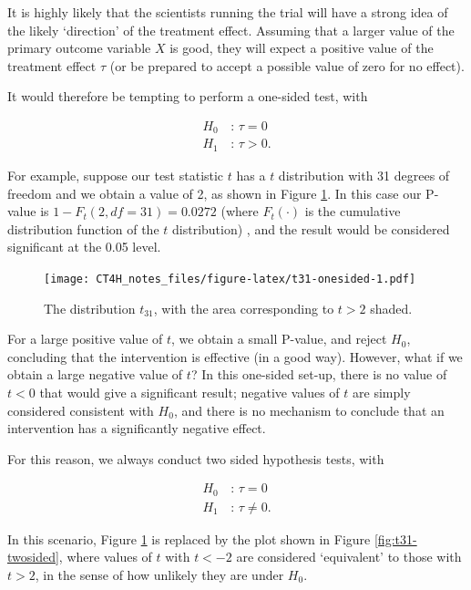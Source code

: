 \documentclass[
  openany]{book}
\theoremstyle{definition}
\theoremstyle{definition}
\theoremstyle{definition}
\theoremstyle{definition}
\theoremstyle{remark}
\begin{document}
It is highly likely that the scientists running the trial will have a strong idea of the likely `direction' of the treatment effect. Assuming that a larger value of the primary outcome variable \(X\) is good, they will expect a positive value of the treatment effect \(\tau\) (or be prepared to accept a possible value of zero for no effect).

It would therefore be tempting to perform a one-sided test, with

\begin{align*}
  H_0\,&:\, \tau=0\\
  H_1\,&:\, \tau>0.
\end{align*}

For example, suppose our test statistic \(t\) has a \(t\) distribution with 31 degrees of freedom and we obtain a value of 2, as shown in Figure \ref{fig:t31-onesided}.
In this case our P-value is \(1 - F_t\left(2, df=31\right)= 0.0272\) (where \(F_t\left(\cdot\right)\) is the cumulative distribution function of the \(t\) distribution) , and the result would be considered significant at the 0.05 level.

\begin{figure}
\centering
\texttt{[image: CT4H\_notes\_files/figure-latex/t31-onesided-1.pdf]}
\caption{\label{fig:t31-onesided}The distribution \(t_{31}\), with the area corresponding to \(t > 2\) shaded.}
\end{figure}

For a large positive value of \(t\), we obtain a small P-value, and reject \(H_0\), concluding that the intervention is effective (in a good way). However, what if we obtain a large negative value of \(t\)? In this one-sided set-up, there is no value of \(t<0\) that would give a significant result; negative values of \(t\) are simply considered consistent with \(H_0\), and there is no mechanism to conclude that an intervention has a significantly negative effect.

For this reason, we always conduct two sided hypothesis tests, with

\begin{align*}
  H_0\,&:\, \tau=0\\
  H_1\,&:\, \tau\neq 0.
\end{align*}

In this scenario, Figure \ref{fig:t31-onesided} is replaced by the plot shown in Figure \ref{fig:t31-twosided}, where values of \(t\) with \(t<-2\) are considered `equivalent' to those with \(t>2\), in the sense of how unlikely they are under \(H_0\).
\end{document}
